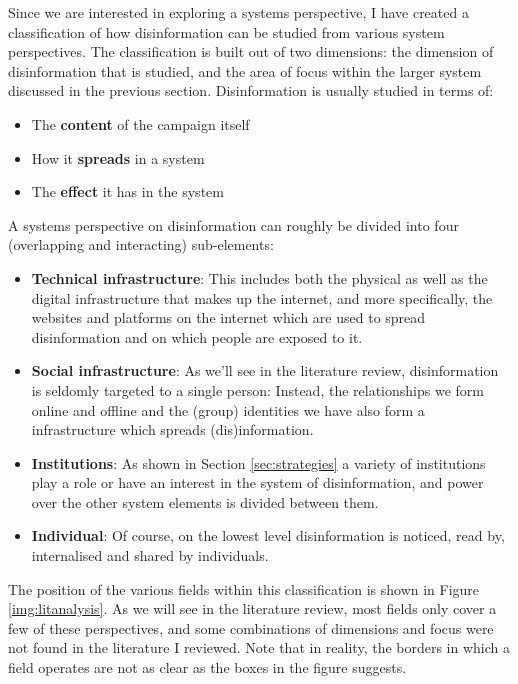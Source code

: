 \documentclass[10pt,a4paper]{article}
\begin{document}
Since we are interested in exploring a systems perspective, I have created a classification of how disinformation can be studied from various system perspectives. The classification is built out of two dimensions: the dimension of disinformation that is studied, and the area of focus within the larger system discussed in the previous section.
Disinformation is usually studied in terms of:
\begin{itemize}
	\item The \textbf{content} of the campaign itself
	\item How it \textbf{spreads} in a system
	\item The \textbf{effect} it has in the system	
\end{itemize}
A systems perspective on disinformation can roughly be divided into four (overlapping and interacting) sub-elements:
\begin{itemize}
	\item \textbf{Technical infrastructure}: This includes both the physical as well as the digital infrastructure that makes up the internet, and more specifically, the websites and platforms on the internet which are used to spread disinformation and on which people are exposed to it.
	\item \textbf{Social infrastructure}: As we'll see in the literature review, disinformation is seldomly targeted to a single person: Instead, the relationships we form online and offline and the (group) identities we have also form a infrastructure which spreads (dis)information. 
	\item \textbf{Institutions}: As shown in Section \ref{sec:strategies} a variety of institutions play a role or have an interest in the system of disinformation, and power over the other system elements is divided between them.
	\item \textbf{Individual}: Of course, on the lowest level disinformation is noticed, read by, internalised and shared by individuals. 
\end{itemize}
The position of the various fields within this classification is shown in Figure \ref{img:litanalysis}. As we will see in the literature review, most fields only cover a few of these perspectives, and some combinations of dimensions and focus were not found in the literature I reviewed. Note that in reality, the borders in which a field operates are not as clear as the boxes in the figure suggests. \\
\end{document}
